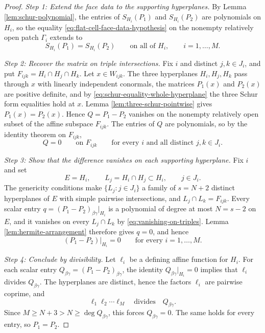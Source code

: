 \documentclass[10pt,a4paper]{amsart}
\begin{document}
\begin{proof}
\emph{Step 1: Extend the face data to the supporting hyperplanes.}
By Lemma \ref{lem:schur-polynomial}, the entries of \(S_{H_i}(P_1)\) and
\(S_{H_i}(P_2)\) are polynomials on \(H_i\), so the equality
\eqref{eq:flat-cell-face-data-hypothesis} on the nonempty relatively open
patch \(\Gamma_i\) extends to
\begin{equation}
  S_{H_i}(P_1)=S_{H_i}(P_2)
  \qquad\text{on all of }H_i,
  \qquad i=1,\ldots,M.
  \label{eq:schur-equality-whole-hyperplane}
\end{equation}

\emph{Step 2: Recover the matrix on triple intersections.}
Fix \(i\) and distinct \(j,k\in J_i\), and put
\(F_{ijk}=H_i\cap H_j\cap H_k\).  Let \(x\in W_{ijk}\).  The three hyperplanes
\(H_i,H_j,H_k\) pass through \(x\) with linearly independent conormals, the
matrices \(P_1(x)\) and \(P_2(x)\) are positive definite, and by
\eqref{eq:schur-equality-whole-hyperplane} the three Schur form equalities hold
at \(x\).  Lemma \ref{lem:three-schur-pointwise} gives \(P_1(x)=P_2(x)\).
Hence \(Q=P_1-P_2\) vanishes on the nonempty
relatively open subset of the affine subspace \(F_{ijk}\).  The entries of
\(Q\) are polynomials, so by the identity theorem on \(F_{ijk}\),
\begin{equation}
  Q=0\qquad\text{on }F_{ijk}
  \qquad\text{for every }i\text{ and all distinct }j,k\in J_i.
  \label{eq:vanishing-on-triples}
\end{equation}

\emph{Step 3: Show that the difference vanishes on each supporting hyperplane.}
Fix \(i\) and set
\begin{equation}
  E=H_i,
  \qquad L_j=H_i\cap H_j\subset H_i,
  \qquad j\in J_i .
\end{equation}
The genericity conditions make \(\{L_j:j\in J_i\}\) a family of \(s=N+2\)
distinct hyperplanes of \(E\) with simple pairwise intersections, and
\(L_j\cap L_k=F_{ijk}\).  Every scalar entry
\(q=(P_1-P_2)_{\beta\gamma}|_{H_i}\) is a polynomial of degree at most
\(N=s-2\) on \(E\), and it vanishes on every \(L_j\cap L_k\) by
\eqref{eq:vanishing-on-triples}.  Lemma \ref{lem:hermite-arrangement} therefore
gives \(q=0\), and hence
\begin{equation}
  (P_1-P_2)|_{H_i}=0
  \qquad\text{for every }i=1,\ldots,M .
\end{equation}

\emph{Step 4: Conclude by divisibility.}
Let \(\ell_i\) be a defining affine function for \(H_i\).  For each scalar
entry \(Q_{\beta\gamma}=(P_1-P_2)_{\beta\gamma}\), the identity
\(Q_{\beta\gamma}|_{H_i}=0\) implies that \(\ell_i\) divides
\(Q_{\beta\gamma}\).  The hyperplanes are distinct, hence the factors
\(\ell_i\) are pairwise coprime, and
\begin{equation}
  \ell_1\ell_2\cdots\ell_M \quad\text{divides}\quad Q_{\beta\gamma} .
\end{equation}
Since \(M\ge N+3>N\ge\deg Q_{\beta\gamma}\), this forces
\(Q_{\beta\gamma}=0\).  The same holds for every entry, so \(P_1=P_2\).
\end{proof}
\end{document}
